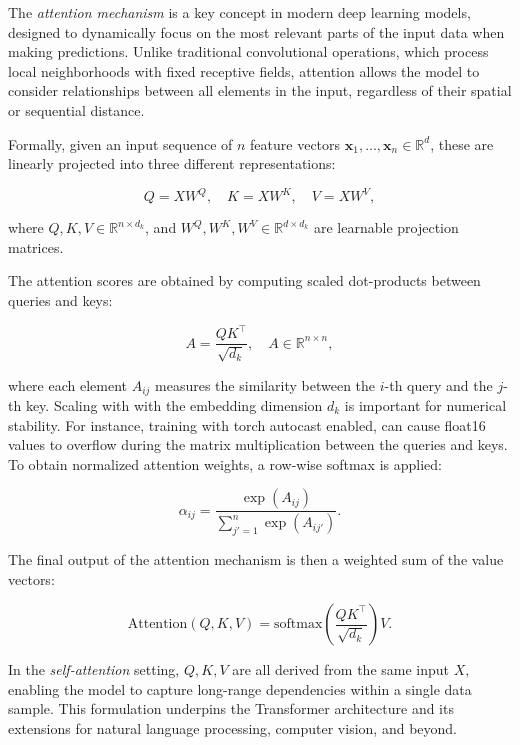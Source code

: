 The \textit{attention mechanism} is a key concept in modern deep learning models, designed to dynamically focus on the most relevant parts of the input data when making predictions. Unlike traditional convolutional operations, which process local neighborhoods with fixed receptive fields, attention allows the model to consider relationships between all elements in the input, regardless of their spatial or sequential distance.  

Formally, given an input sequence of $n$ feature vectors $\mathbf{x}_1, \ldots, \mathbf{x}_n \in \mathbb{R}^d$, these are linearly projected into three different representations:  

\begin{equation}
Q = XW^Q, \quad K = XW^K, \quad V = XW^V,
\label{Eq:2.1}
\end{equation}

where $Q, K, V \in \mathbb{R}^{n \times d_k}$, and $W^Q, W^K, W^V \in \mathbb{R}^{d \times d_k}$ are learnable projection matrices.  

The attention scores are obtained by computing scaled dot-products between queries and keys:  

\begin{equation}
A = \frac{QK^\top}{\sqrt{d_k}}, \quad A \in \mathbb{R}^{n \times n},
\label{Eq:2.2}
\end{equation}

where each element $A_{ij}$ measures the similarity between the $i$-th query and the $j$-th key. Scaling with with the embedding dimension $d_k$ is important for numerical stability. For instance, training with torch autocast enabled, can cause float16 values to overflow during the matrix multiplication between the queries and keys. To obtain normalized attention weights, a row-wise softmax is applied:  

\begin{equation}
\alpha_{ij} = \frac{\exp(A_{ij})}{\sum_{j'=1}^n \exp(A_{ij'})}.
\end{equation}

The final output of the attention mechanism is then a weighted sum of the value vectors:  

\begin{equation}
\text{Attention}(Q, K, V) = \text{softmax}\!\left(\frac{QK^\top}{\sqrt{d_k}}\right)V.
\end{equation}

In the \textit{self-attention} setting, $Q, K, V$ are all derived from the same input $X$, enabling the model to capture long-range dependencies within a single data sample. This formulation underpins the Transformer architecture and its extensions for natural language processing, computer vision, and beyond.

